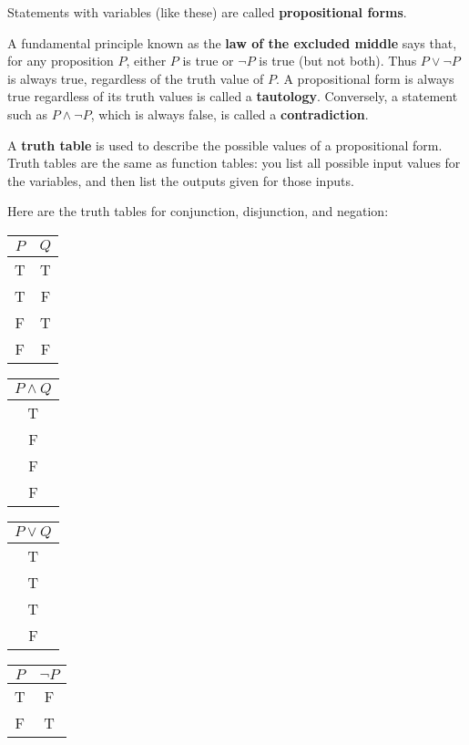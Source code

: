 \documentclass[12pt,a4paper]{article}
\begin{document}
Statements with variables (like these) are called \textbf{propositional forms}.

\bigbreak

A fundamental principle known as the \textbf{law of the excluded middle} says that, for any proposition $P$, either $P$ is true or $\neg P$ is true (but not both). Thus $P\vee\neg P$ is always true, regardless of the truth value of $P$. A propositional form is always true regardless of its truth values is called a \textbf{tautology}. Conversely, a statement such as $P\wedge\neg P$, which is always false, is called a \textbf{contradiction}.

\bigbreak

A \textbf{truth table} is used to describe the possible values of a propositional form. Truth tables are the same as function tables: you list all possible input values for the variables, and then list the outputs given for those inputs.

\bigbreak

Here are the truth tables for conjunction, disjunction, and negation:
\begin{center}
	\begin{tabular}{ |c|c| }
		\hline
		$P$ & $Q$ \\
		\hline
		T & T \\
		\hline
		T & F \\ 
		\hline
		F & T \\ 
		\hline
		F & F \\
		\hline
	\end{tabular}
	\begin{tabular}{ |c| }
		\hline
		$P\wedge Q$ \\
		\hline
		T \\
		\hline
		F \\
		\hline
		F \\
		\hline
		F \\
		\hline
	\end{tabular}
	\begin{tabular}{ |c| }
		\hline
		$P\vee Q$ \\
		\hline
		T \\
		\hline
		T \\
		\hline
		T \\
		\hline
		F \\
		\hline
	\end{tabular}
	\begin{tabular}{ |c|c| }
		\hline
		$P$ & $\neg P$ \\
		\hline
		T & F \\
		\hline
		F & T \\
		\hline		
	\end{tabular}
\end{center}
\end{document}
